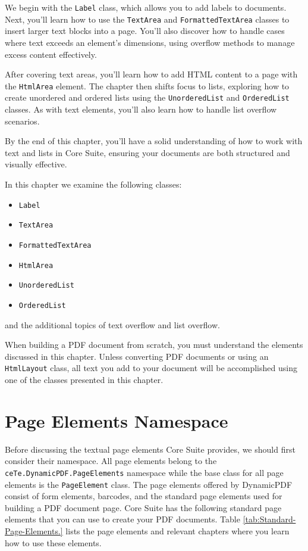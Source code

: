 \documentclass[american]{tufte-book}
\numberwithin{equation}{section}
\numberwithin{figure}{section}
\begin{document}
We begin with the \texttt{Label} class, which allows you to add labels to documents. Next, you'll learn how to use the \texttt{TextArea} and \texttt{FormattedTextArea} classes to insert larger text blocks into a page. You'll also discover how to handle cases where text exceeds an element's dimensions, using overflow methods to manage excess content effectively.

After covering text areas, you'll learn how to add HTML content to a page with the \texttt{HtmlArea} element. The chapter then shifts focus to lists, exploring how to create unordered and ordered lists using the \texttt{UnorderedList} and \texttt{OrderedList} classes. As with text elements, you'll also learn how to handle list overflow scenarios.

By the end of this chapter, you'll have a solid understanding of how to work with text and lists in Core Suite, ensuring your documents are both structured and visually effective.

In this chapter we examine the following classes:
\begin{itemize}
\item \texttt{Label}
\item \texttt{TextArea}
\item \texttt{FormattedTextArea}
\item \texttt{HtmlArea}
\item \texttt{UnorderedList}
\item \texttt{OrderedList}
\end{itemize}
and the additional topics of text overflow and list overflow.

When building a PDF document from scratch, you must understand the
elements discussed in this chapter. Unless converting PDF documents
or using an \texttt{HtmlLayout} class, all text you add to your document
will be accomplished using one of the classes presented in this chapter. 

\section{Page Elements Namespace}

Before discussing the textual page elements Core Suite provides, we
should first consider their namespace. All page elements belong to
the \texttt{ceTe.DynamicPDF\allowbreak.PageElements} namespace while the base
class for all page elements is the \texttt{PageElement} class. The
page elements offered by DynamicPDF consist of form elements, barcodes,
and the standard page elements used for building a PDF document page.
Core Suite has the following standard page elements that you can
use to create your PDF documents. Table \ref{tab:Standard-Page-Elements.}
lists the page elements and relevant chapters where you learn how
to use these elements.
\end{document}
